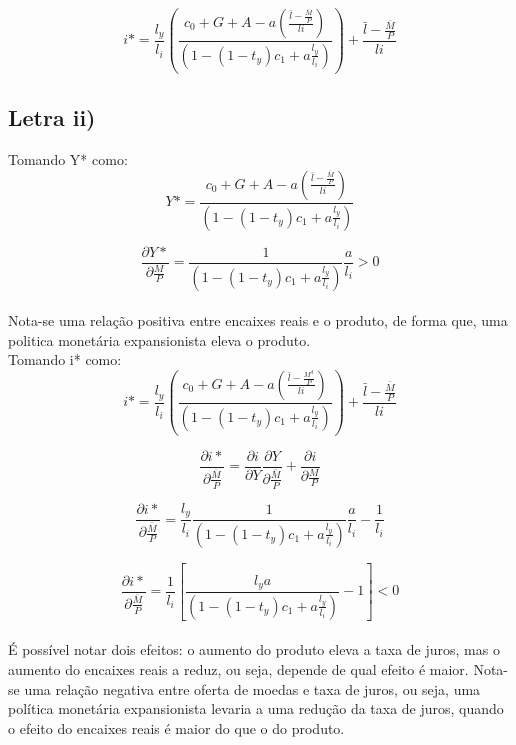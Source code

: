 \documentclass{article}
\begin{document}
\begin{equation}
i* = \frac{l_y}{l_i}(\frac{ c_0 + G + A -a( \frac{\bar{l} - \frac{\bar{M}}{P}}{li})}{(1 - (1-t_y)c_1 + a\frac{l_y }{l_i})}) + \frac{\bar{l} - \frac{\bar{M}}{P}}{li}
\end{equation}
\clearpage

\subsection*{Letra ii)}
Tomando Y* como:
\begin{equation}
Y* =\frac{ c_0 + G + A -a( \frac{\bar{l} - \frac{\bar{M}}{P}}{li})}{(1 - (1-t_y)c_1 + a\frac{l_y }{l_i})}
\end{equation}

\begin{equation}
\frac{\partial Y*}{\partial \frac{M}{P}} = \frac{1}{(1 - (1-t_y)c_1 + a\frac{l_y }{l_i})} \frac{a}{l_i} > 0
\end{equation}
\\
Nota-se uma relação positiva entre encaixes reais e o produto, de forma que, uma politica monetária expansionista eleva o produto.
\bigskip
\\
Tomando i* como:
\begin{equation}
i* = \frac{l_y}{l_i}(\frac{ c_0 + G + A -a( \frac{\bar{l} - \frac{M^{d}}{P}}{li})}{(1 - (1-t_y)c_1 + a\frac{l_y }{l_i})}) + \frac{\bar{l} - \frac{\bar{M}}{P}}{li}
\end{equation}

\begin{equation}
\frac{\partial i*}{\partial \frac{\bar{M}}{P}} = \frac{\partial i }{\partial Y }\frac{\partial Y}{\partial \frac{\bar{M}}{P}} + \frac{\partial i}{\partial \frac{M}{P}} 
\end{equation}

\begin{equation}
\frac{\partial i*}{\partial \frac{\bar{M}}{P}} = \frac{l_y}{l_i}\frac{1}{(1 - (1-t_y)c_1 + a\frac{l_y }{l_i})} \frac{a}{l_i} - \frac{1}{l_i}
\end{equation}

\begin{equation}
\frac{\partial i*}{\partial \frac{\bar{M}}{P}} = \frac{1}{l_i} \left[ \frac{l_y a}{(1 - (1-t_y)c_1 + a\frac{l_y }{l_i})} - 1 \right] < 0
\end{equation}
\\
É possível notar dois efeitos: o aumento do produto eleva a taxa de juros, mas o aumento do encaixes reais a reduz, ou seja, depende de qual efeito é maior.
Nota-se uma relação negativa entre oferta de moedas e taxa de juros, ou seja, uma política monetária expansionista levaria a uma redução da taxa de juros, quando o efeito do encaixes reais é maior do que o do produto.
\clearpage
\end{document}
